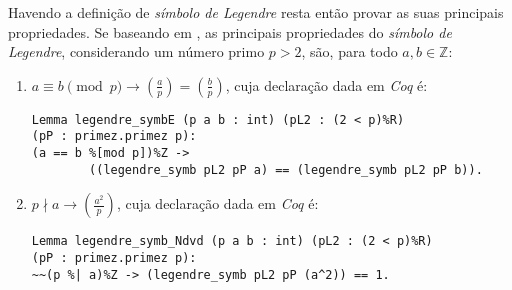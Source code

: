 Havendo a definição de \textit{símbolo de Legendre} resta então provar as suas principais propriedades. Se baseando em \cite{book:2399854}, as principais propriedades do \textit{símbolo de Legendre}, considerando um número primo $p > 2$, são, para todo $a, b \in \mathbb{Z}$:
        \begin{enumerate}
        \item $a \equiv b \pmod{p} \rightarrow \left(\frac{a}{p}\right) = \left(\frac{b}{p}\right)$, cuja declaração dada em \textit{Coq} é:
        \newline
                \begin{lstlisting}[language=coq,frame=single,tabsize=1]
Lemma legendre_symbE (p a b : int) (pL2 : (2 < p)%R) 
(pP : primez.primez p):
(a == b %[mod p])%Z -> 
        ((legendre_symb pL2 pP a) == (legendre_symb pL2 pP b)).
                \end{lstlisting}
        
        \item $p \nmid a \rightarrow \left(\frac{a^2}{p}\right)$, cuja declaração dada em \textit{Coq} é:
        \newline
                \begin{lstlisting}[language=coq,frame=single,tabsize=1]
Lemma legendre_symb_Ndvd (p a b : int) (pL2 : (2 < p)%R) 
(pP : primez.primez p):
~~(p %| a)%Z -> (legendre_symb pL2 pP (a^2)) == 1.
                \end{lstlisting}
        

\end{enumerate}

